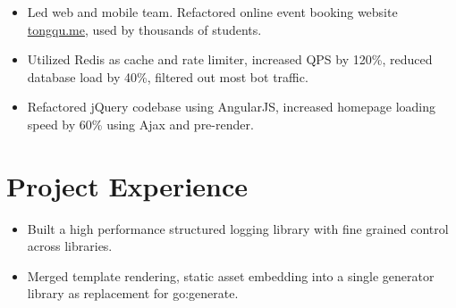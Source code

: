 \documentclass[11pt, letterpaper]{simple-cv}
\begin{document}

\begin{itemize}
	\item Led web and mobile team. Refactored online event booking website \href{https://tongqu.me}{tongqu.me}, used by thousands of students.
	\item Utilized Redis as cache and rate limiter, increased QPS by 120\%, reduced database load by 40\%, filtered out most bot traffic.
	\item Refactored jQuery codebase using AngularJS, increased homepage loading speed by 60\% using Ajax and pre-render.
\end{itemize}

\section{Project Experience}


\begin{itemize}
	\item Built a high performance structured logging library with fine grained control across libraries.
	\item Merged template rendering, static asset embedding into a single generator library as replacement for go:generate.
\end{itemize}
\end{document}
